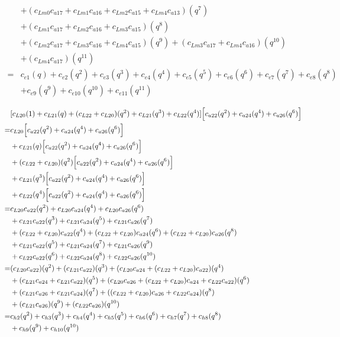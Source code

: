 \documentclass[12pt]{article}
\begin{document}
\begin{align}
    &+ (c_{Lm0}c_{a17} +  c_{Lm1}c_{a16} +  c_{Lm2}c_{a15} + c_{Lm4}c_{a13})(q^7) \nonumber\\
    &+ (c_{Lm1}c_{a17} + c_{Lm2}c_{a16} + c_{Lm3}c_{a15})(q^8) \nonumber\\
    &+ (c_{Lm2}c_{a17} + c_{Lm3}c_{a16} + c_{Lm4}c_{a15})(q^9) + (c_{Lm3}c_{a17} + c_{Lm4}c_{a16})(q^{10}) \nonumber\\
    &+ (c_{Lm4}c_{a17})(q^{11}) \\
    =& c_{e1}(q) + c_{e2}(q^2) + c_{e3}(q^3) + c_{e4}(q^4) + c_{e5}(q^5) + c_{e6}(q^6) + c_{e7}(q^7) + c_{e8}(q^8) \nonumber\\
    &+ c_{e9}(q^9) + c_{e10}(q^{10}) + c_{e11}(q^{11})
\end{align}

\begin{align}
    &[ c_{L20}(1) + c_{L21}(q)  + (c_{L22} +  c_{L20})(q^2) + c_{L21}(q^3)  + c_{L22}(q^4)]\Bigl[ c_{a22}(q^2) + c_{a24}(q^4)+ c_{a26}(q^6) \Bigr]\\
    =& c_{L20}\Bigl[ c_{a22}(q^2) + c_{a24}(q^4)+ c_{a26}(q^6) \Bigr] \nonumber\\
    &+ c_{L21}(q)\Bigl[ c_{a22}(q^2) + c_{a24}(q^4)+ c_{a26}(q^6) \Bigr] \nonumber\\
    &+ (c_{L22} +  c_{L20})(q^2)\Bigl[ c_{a22}(q^2) + c_{a24}(q^4)+ c_{a26}(q^6) \Bigr] \nonumber\\
    &+ c_{L21}(q^3)\Bigl[ c_{a22}(q^2) + c_{a24}(q^4)+ c_{a26}(q^6) \Bigr] \nonumber\\
    &+ c_{L22}(q^4)\Bigl[ c_{a22}(q^2) + c_{a24}(q^4)+ c_{a26}(q^6) \Bigr] \\
    =&  c_{L20}c_{a22}(q^2) + c_{L20}c_{a24}(q^4)+ c_{L20}c_{a26}(q^6)  \nonumber\\
    &+  c_{L21}c_{a22}(q^3) + c_{L21}c_{a24}(q^5)+ c_{L21}c_{a26}(q^7)  \nonumber\\
    &+  (c_{L22} +  c_{L20})c_{a22}(q^4) + (c_{L22} +  c_{L20})c_{a24}(q^6)+ (c_{L22} +  c_{L20})c_{a26}(q^8)  \nonumber\\
    &+  c_{L21}c_{a22}(q^5) + c_{L21}c_{a24}(q^7)+ c_{L21}c_{a26}(q^9)  \nonumber\\
    &+  c_{L22}c_{a22}(q^6) + c_{L22}c_{a24}(q^8)+ c_{L22}c_{a26}(q^{10}) \\
    =& (c_{L20}c_{a22})(q^2) + (c_{L21}c_{a22})(q^3) + (c_{L20}c_{a24} + (c_{L22} +  c_{L20})c_{a22})(q^4) \nonumber\\
    &+ (c_{L21}c_{a24} + c_{L21}c_{a22})(q^5) + (c_{L20}c_{a26} + (c_{L22} +  c_{L20})c_{a24} + c_{L22}c_{a22})(q^6) \nonumber\\
    &+ (c_{L21}c_{a26} + c_{L21}c_{a24})(q^7) + ((c_{L22} +  c_{L20})c_{a26} + c_{L22}c_{a24})(q^8) \nonumber\\
    &+ (c_{L21}c_{a26})(q^9) + (c_{L22}c_{a26})(q^{10})\\
    =& c_{h2}(q^2) + c_{h3}(q^3) + c_{h4}(q^4) + c_{h5}(q^5) + c_{h6}(q^6) + c_{h7}(q^7) + c_{h8}(q^8) \nonumber\\
    &+ c_{h9}(q^9) + c_{h10}(q^{10})
\end{align}
\end{document}
